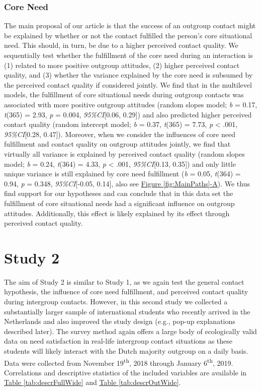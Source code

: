 \documentclass[man, 12pt, a4paper, mask]{apa7}
\theoremstyle{break}
\theoremstyle{plain}
\newcommand{\fgrref}[2][]{\hyperref[#2]{Figure \ref*{#2}#1}}
\newcommand{\tblref}[2][]{\hyperref[#2]{Table \ref*{#2}#1}}
\begin{document}
\subsubsection{Core Need}

The main proposal of our article is that the success of an outgroup
contact might be explained by whether or not the contact fulfilled the
person's core situational need. This should, in turn, be due to a higher
perceived contact quality. We sequentially test whether the fulfillment
of the core need during an interaction is (1) related to more positive
outgroup attitudes, (2) higher perceived contact quality, and (3)
whether the variance explained by the core need is subsumed by the
perceived contact quality if considered jointly. We find that in the
multilevel models, the fulfillment of core situational needs during
outgroup contacts was associated with more positive outgroup attitudes
(random slopes model; \textit{b} = 0.17, \textit{t}(365) = 2.93,
\textit{p} = 0.004, \textit{95\%CI}{[}0.06, 0.29{]}) and also predicted
higher perceived contact quality (random intercept model; \textit{b} = 0.37,
\textit{t}(365) = 7.73, \textit{p} \textless{} .001,
\textit{95\%CI}{[}0.28, 0.47{]}). Moreover, when we consider the
influences of core need fulfillment and contact quality on outgroup
attitudes jointly, we find that virtually all variance is explained by
perceived contact quality (random slopes model; \textit{b} = 0.24, 
\textit{t}(364) = 4.33, \textit{p} \textless{}
.001, \textit{95\%CI}{[}0.13, 0.35{]}) and only little unique variance
is still explained by core need fulfillment (\textit{b} = 0.05,
\textit{t}(364) = 0.94, \textit{p} = 0.348, \textit{95\%CI}{[}-0.05,
0.14{]}, also see \fgrref[-A]{fig:MainPaths}). We thus find support for
our hypotheses and can conclude that in this data set the fulfillment of
core situational needs had a significant influence on outgroup
attitudes. Additionally, this effect is likely explained by its effect
through perceived contact quality.

\section{Study 2}

The aim of Study 2 is similar to Study 1, as we again test the general
contact hypothesis, the influence of core need fulfillment, and
perceived contact quality during intergroup contacts. However, in this
second study we collected a substantially larger sample of international
students who recently arrived in the Netherlands and also improved the
study design (e.g., pop-up explanations described later). The survey
method again offers a large body of ecologically valid data on need
satisfaction in real-life intergroup contact situations as these
students will likely interact with the Dutch majority outgroup on a
daily basis. Data were collected from November 19\textsuperscript{th},
2018 through January 6\textsuperscript{th}, 2019. Correlations and
descriptive statistics of the included variables are available in
\tblref{tab:descrFullWide} and \tblref{tab:descrOutWide}.
\end{document}
